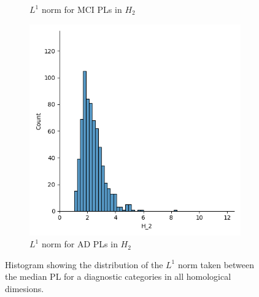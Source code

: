 \documentclass{article}
\begin{document}
\begin{figure}
\begin{subfigure}{0.32\textwidth}
    \caption{$L^1$ norm for MCI PLs in $H_2$}
  \end{subfigure}
  \begin{subfigure}{0.32\textwidth}
    \includegraphics[width=\textwidth]{figures/median_pls/median_pl_AD_H_2.png}
    \caption{$L^1$ norm for AD PLs in $H_2$}
  \end{subfigure}
  \caption{Histogram showing the distribution of the $L^1$ norm taken between the median PL for a diagnostic categories in all homological dimesions.}
  \label{fig:displots_median_pl}
\end{figure}
\end{document}
